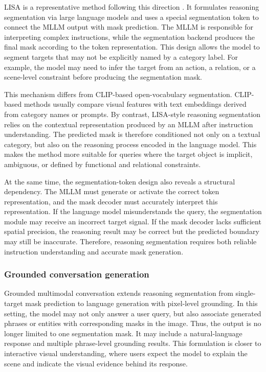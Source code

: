 LISA is a representative method following this direction \cite{Lai2024}. 
It formulates reasoning segmentation via large language models and uses a special segmentation token to connect the MLLM output with mask prediction. 
The MLLM is responsible for interpreting complex instructions, while the segmentation backend produces the final mask according to the token representation. 
This design allows the model to segment targets that may not be explicitly named by a category label. 
For example, the model may need to infer the target from an action, a relation, or a scene-level constraint before producing the segmentation mask.

This mechanism differs from CLIP-based open-vocabulary segmentation. 
CLIP-based methods usually compare visual features with text embeddings derived from category names or prompts. 
By contrast, LISA-style reasoning segmentation relies on the contextual representation produced by an MLLM after instruction understanding. 
The predicted mask is therefore conditioned not only on a textual category, but also on the reasoning process encoded in the language model. 
This makes the method more suitable for queries where the target object is implicit, ambiguous, or defined by functional and relational constraints.

At the same time, the segmentation-token design also reveals a structural dependency. 
The MLLM must generate or activate the correct token representation, and the mask decoder must accurately interpret this representation. 
If the language model misunderstands the query, the segmentation module may receive an incorrect target signal. 
If the mask decoder lacks sufficient spatial precision, the reasoning result may be correct but the predicted boundary may still be inaccurate. 
Therefore, reasoning segmentation requires both reliable instruction understanding and accurate mask generation.

\subsubsection{Grounded conversation generation}

Grounded multimodal conversation extends reasoning segmentation from single-target mask prediction to language generation with pixel-level grounding. 
In this setting, the model may not only answer a user query, but also associate generated phrases or entities with corresponding masks in the image. 
Thus, the output is no longer limited to one segmentation mask. 
It may include a natural-language response and multiple phrase-level grounding results. 
This formulation is closer to interactive visual understanding, where users expect the model to explain the scene and indicate the visual evidence behind its response.

